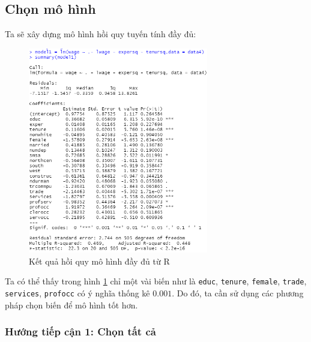 \subsection*{Chọn mô hình}

Ta sẽ xây dựng mô hình hồi quy tuyến tính đầy đủ:

\begin{figure}[H]
	\centering
	\includegraphics[width=0.7\textwidth]{../Photo Of Result/full-model-data4}
	\caption{Kết quả hồi quy mô hình đầy đủ từ R}
	\label{full-model}
\end{figure}

Ta có thể thấy trong hình \ref{full-model} chỉ một vài biến như là \texttt{educ}, \texttt{tenure}, \texttt{female}, \texttt{trade}, \texttt{services}, \texttt{profocc} có ý nghĩa thống kê $0.001$. Do đó, ta cần sử dụng các phương pháp chọn biến để mô hình tốt hơn.

\subsubsection*{Hướng tiếp cận 1: Chọn tất cả}

